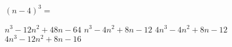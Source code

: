 
\question $(n - 4)^3 = $

  \begin{oneparchoices}
    \CorrectChoice $n^3 -12n^2 + 48n - 64$
    \choice $n^3 -4n^2 + 8n - 12$
    \choice $4n^3 -4n^2 + 8n - 12$
    \choice $4n^3 -12n^2 + 8n - 16$
  \end{oneparchoices}

